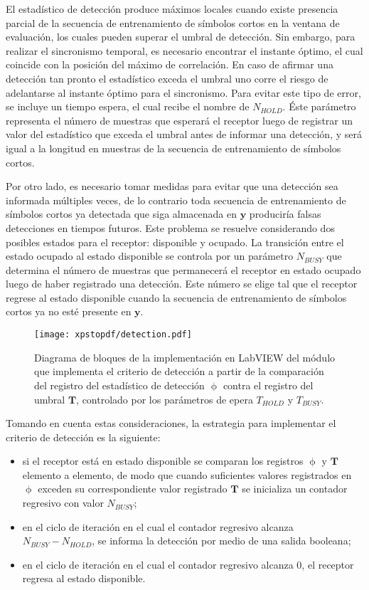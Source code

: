 El estadístico de detección produce máximos locales cuando existe presencia parcial de la secuencia de entrenamiento de símbolos cortos en la ventana de evaluación, los cuales pueden superar el umbral de detección. Sin embargo, para realizar el sincronismo temporal, es necesario encontrar el instante óptimo, el cual coincide con la posición del máximo de correlación. En caso de afirmar una detección tan pronto el estadístico exceda el umbral uno corre el riesgo de adelantarse al instante óptimo para el sincronismo. Para evitar este tipo de error, se incluye un tiempo espera, el cual recibe el nombre de $N_{HOLD}$. Éste parámetro representa el número de muestras que esperará el receptor luego de registrar un valor del estadístico que exceda el umbral antes de informar una detección, y será igual a la longitud en muestras de la secuencia de entrenamiento de símbolos cortos.

Por otro lado, es necesario tomar medidas para evitar que una detección sea informada múltiples veces, de lo contrario toda secuencia de entrenamiento de símbolos cortos ya detectada que siga almacenada en $\mathbf{y}$ produciría falsas detecciones en tiempos futuros. Este problema se resuelve considerando dos posibles estados para el receptor: disponible y ocupado. La transición entre el estado ocupado al estado disponible se controla por un parámetro $N_{BUSY}$ que determina el número de muestras que permanecerá el receptor en estado ocupado luego de haber registrado una detección. Este número se elige tal que el receptor regrese al estado disponible cuando la secuencia de entrenamiento de símbolos cortos ya no esté presente en $\mathbf{y}$.

\begin{figure}[t]
    \centering{}\texttt{[image: xpstopdf/detection.pdf]}
    \caption{Diagrama de bloques de la implementación en LabVIEW del módulo que implementa el criterio de detección a partir de la comparación del registro del estadístico de detección $\upphi$ contra el registro del umbral $\mathbf{T}$, controlado por los parámetros de epera $T_{HOLD}$ y $T_{BUSY}$.\label{fig:detection-lv}}  
\end{figure}

Tomando en cuenta estas consideraciones, la estrategia para implementar el criterio de detección es la siguiente:
\begin{itemize}
    \item si el receptor está en estado disponible se comparan los registros $\upphi$ y $\mathbf{T}$ elemento a elemento, de modo que cuando suficientes valores registrados en $\upphi$ exceden su correspondiente valor registrado $\mathbf{T}$ se inicializa un contador regresivo con valor $N_{BUSY}$;
    \item en el ciclo de iteración en el cual el contador regresivo alcanza $N_{BUSY}-N_{HOLD}$, se informa la detección por medio de una salida booleana;
    \item en el ciclo de iteración en el cual el contador regresivo alcanza 0, el receptor regresa al estado disponible.
\end{itemize}

